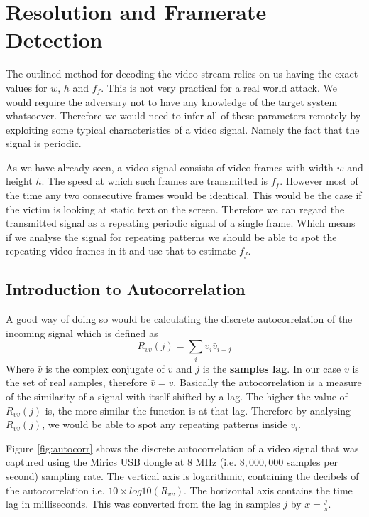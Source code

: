 \documentclass[a4paper,12pt,twoside,openright]{report}
\begin{document}
\section{Resolution and Framerate Detection}

The outlined method for decoding the video stream relies on us having the exact values for $w$, $h$ and $f_{f}$. This is not very practical for a real world attack. We would require the adversary not to have any knowledge of the target system whatsoever. Therefore we would need to infer all of these parameters remotely by exploiting some typical characteristics of a video signal. Namely the fact that the signal is periodic.

As we have already seen, a video signal consists of video frames with width $w$ and height $h$. The speed at which such frames are transmitted is $f_{f}$. However most of the time any two consecutive frames would be identical. This would be the case if the victim is looking at static text on the screen. Therefore we can regard the transmitted signal as a repeating periodic signal of a single frame. Which means if we analyse the signal for repeating patterns we should be able to spot the repeating video frames in it and use that to estimate $f_{f}$.

\subsection{Introduction to Autocorrelation}
A good way of doing so would be calculating the discrete autocorrelation\cite{bracewell1965autocorrelation} of the incoming signal which is defined as 
$$ R_{vv}(j)=\sum\limits_{i} v_{i} \bar{v}_{i-j} $$
Where $\bar{v}$ is the complex conjugate of $v$ and $j$ is the \textbf{samples lag}. In our case $v$ is the set of real samples, therefore $\bar{v} = v$. Basically the autocorrelation is a measure of the similarity of a signal with itself shifted by a lag. The higher the value of $R_{vv}(j)$ is, the more similar the function is at that lag. Therefore by analysing $R_{vv}(j)$, we would be able to spot any repeating patterns inside $v_{i}$.

Figure \ref{fig:autocorr} shows the discrete autocorrelation of a video signal that was captured using the Mirics USB dongle at 8 MHz (i.e. $8,000,000$ samples per second) sampling rate. The vertical axis is logarithmic, containing the decibels of the autocorrelation i.e. $10 \times log10( R_{vv} )$. The horizontal axis contains the time lag in milliseconds. This was converted from the lag in samples $j$ by $x = \frac{j}{s}$.
\end{document}
